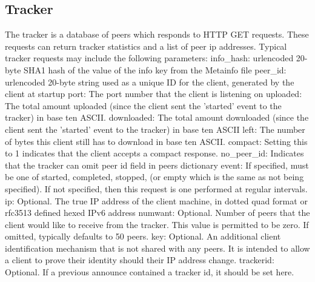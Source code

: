 \documentclass[letter]{scrartcl}
\begin{document}
\subsection{Tracker}
	The tracker is a database of peers which responds to HTTP GET requests.  These requests can return tracker statistics and a list of peer ip addresses. Typical tracker requests may include the following parameters:
info\_hash: urlencoded 20-byte SHA1 hash of the value of the info key from the Metainfo file
peer\_id: urlencoded 20-byte string used as a unique ID for the client, generated by the client at startup
port: The port number that the client is listening on
uploaded: The total amount uploaded (since the client sent the 'started' event to the tracker) in base ten ASCII.
downloaded:  The total amount downloaded (since the client sent the 'started' event to the tracker) in base ten ASCII
left: The number of bytes this client still has to download in base ten ASCII.
compact: Setting this to 1 indicates that the client accepts a compact response.
no\_peer\_id: Indicates that the tracker can omit peer id field in peers dictionary
event:  If specified, must be one of started, completed, stopped, (or empty which is the same as not being specified). If not specified, then this request is one performed at regular intervals.
ip: Optional. The true IP address of the client machine, in dotted quad format or rfc3513 defined hexed IPv6 address
numwant: Optional. Number of peers that the client would like to receive from the tracker. This value is permitted to be zero. If omitted, typically defaults to 50 peers.
key: Optional. An additional client identification mechanism that is not shared with any peers. It is intended to allow a client to prove their identity should their IP address change.
trackerid: Optional. If a previous announce contained a tracker id, it should be set here.
\end{document}
